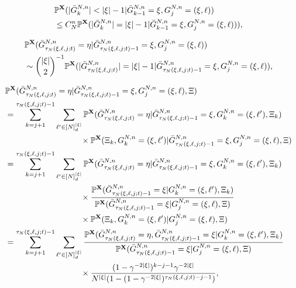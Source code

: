 \documentclass[10pt,a4paper]{amsart}
\newcommand{\bbP}{\mathbb{P}}
\newcommand{\bfX}{\mathbf{X}}
\begin{document}
\begin{align} 
&\bbP^{ \bfX }( | \bar{ G }_k^{ N, n } | < | \xi | - 1 | \bar{ G }_{ k - 1 }^{ N, n } = \xi, G_j^{ N, n } = ( \xi, \ell ) ) \notag \\
&\leq C_N^n \bbP^{ \bfX }( | \bar{ G }_k^{ N, n } | = | \xi | - 1 | \bar{ G }_{ k - 1 }^{ N, n } = \xi, G_j^{ N, n } = ( \xi, \ell ) ) ), \label{eq:large_mergers_vanish} 
\end{align}

\begin{align}
&\bbP^{ \bfX }( \bar{ G }_{ \tau_N( \xi, \ell, j; t ) }^{ N, n } = \eta | \bar{ G }_{ \tau_N( \xi, \ell, j; t ) - 1 }^{ N, n } = \xi, G_j^{ N, n } = ( \xi, \ell ) ) \notag \\
&\sim \binom{ | \xi | }{ 2 }^{ -1 } \bbP^{ \bfX }( | \bar{ G }_{ \tau_N( \xi, \ell, j; t ) }^{ N, n } | = | \xi | - 1  | \bar{ G }_{ \tau_N( \xi, \ell, j; t ) - 1 }^{ N, n } = \xi, G_j^{ N, n } = ( \xi, \ell ) ), \label{eq:binary_uniformity}
\end{align}

\begin{align}
&\bbP^{ \bfX }( \bar{ G }_{ \tau_N( \xi, \ell, j; t ) }^{ N, n } = \eta | \bar{ G }_{ \tau_N( \xi, \ell, j; t ) - 1 }^{ N, n } = \xi, G_j^{ N, n } = ( \xi, \ell ), \Xi ) \notag \\
&= \sum_{k = j + 1}^{\tau_N(\xi, \ell, j; t) - 1} \sum_{\ell' \in [N]_d^{|\xi|}} \bbP^{\bfX}(\bar{ G }_{ \tau_N( \xi, \ell, j; t ) }^{ N, n } = \eta | \bar{ G }_{ \tau_N( \xi, \ell, j; t ) - 1 }^{ N, n } = \xi, G_k^{N, n} = (\xi, \ell'), \Xi_k) \notag \\
&\mspace{166mu} \times \bbP^{\bfX}(\Xi_k, G_k^{ N, n } = ( \xi, \ell' ) | \bar{ G }_{ \tau_N( \xi, \ell, j; t ) - 1 }^{ N, n } = \xi, G_j^{ N, n } = ( \xi, \ell ), \Xi) \notag \\
&= \sum_{k = j + 1}^{\tau_N(\xi, \ell, j; t) - 1} \sum_{\ell' \in [N]_d^{|\xi|}} \bbP^{\bfX}(\bar{ G }_{ \tau_N( \xi, \ell, j; t ) }^{ N, n } = \eta | \bar{ G }_{ \tau_N( \xi, \ell, j; t ) - 1 }^{ N, n } = \xi, G_k^{N, n} = (\xi, \ell'), \Xi_k) \notag \\
&\mspace{166mu} \times \frac{\bbP^{\bfX}(\bar{ G }_{ \tau_N( \xi, \ell, j; t ) - 1 }^{ N, n } = \xi | G_k^{ N, n } = ( \xi, \ell' ), \Xi_k)}{\bbP^{\bfX}(\bar{ G }_{ \tau_N( \xi, \ell, j; t ) - 1 }^{ N, n } = \xi | G_j^{ N, n } = ( \xi, \ell ), \Xi)} \notag \\
&\mspace{166mu} \times \bbP^{\bfX}(\Xi_k, G_k^{ N, n } = ( \xi, \ell' ) | G_j^{ N, n } = ( \xi, \ell ), \Xi) \notag \\
&= \sum_{k = j + 1}^{\tau_N(\xi, \ell, j; t) - 1} \sum_{\ell' \in [N]_d^{|\xi|}} \frac{\bbP^{\bfX}(\bar{ G }_{ \tau_N( \xi, \ell, j; t ) }^{ N, n } = \eta, \bar{ G }_{ \tau_N( \xi, \ell, j; t ) - 1 }^{ N, n } = \xi | G_k^{N, n} = (\xi, \ell'), \Xi_k)}{\bbP^{\bfX}(\bar{ G }_{ \tau_N( \xi, \ell, j; t ) - 1 }^{ N, n } = \xi | G_j^{ N, n } = ( \xi, \ell ), \Xi)}\notag \\
&\mspace{166mu} \times \frac{(1 - \gamma^{-2 |\xi|})^{k - j - 1} \gamma^{-2|\xi|}}{N^{|\xi|} (1 - (1 - \gamma^{-2 |\xi|})^{\tau_N(\xi, \ell, j;t) - j - 1})}, \label{eq:label_mixing}
\end{align}
\end{document}
